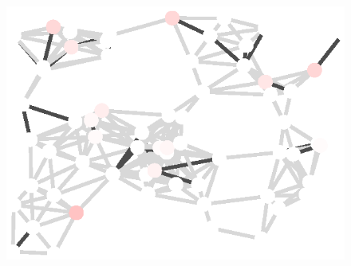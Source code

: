 \begin{figure}[t]
\begin{center}
\begin{minipage}{0.95\textwidth}
\begin{minipage}[t]{0.17\textwidth}
            \end{minipage}\hspace{0.3em}
            \begin{minipage}[t]{0.17\textwidth}
                \centering
                \includegraphics[width=\linewidth]{figures/residual_plot/proposed_2}
            \end{minipage}\hspace{2em}
            \begin{minipage}[t]{0.05\textwidth}
                \centering
            \end{minipage}
        \end{minipage}
    \end{center}
        

\end{figure}
